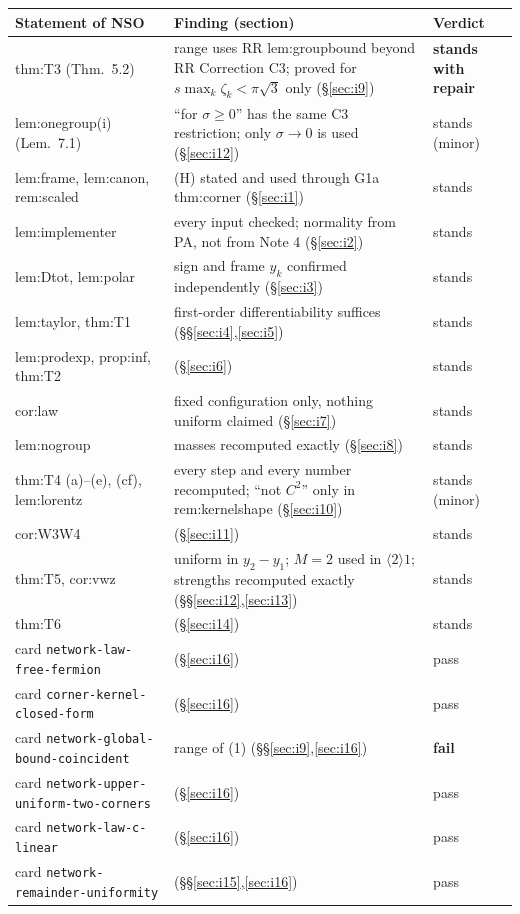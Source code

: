 \documentclass[11pt]{article}
\newcommand{\doc}{\textbf{NSO}}
\begin{document}
\begin{center}\small
\begin{tabularx}{\textwidth}{>{\raggedright\arraybackslash}p{} >{\raggedright\arraybackslash}X >{\raggedright\arraybackslash}p{}}\toprule
Statement of \doc & Finding (section) & Verdict\\\midrule
thm:T3 (Thm.~5.2) & range uses RR lem:groupbound beyond RR Correction C3; proved for $s\max_k\zeta_k<\pi\sqrt3$ only (\S\ref{sec:i9}) & \textbf{stands with repair}\\
lem:onegroup(i) (Lem.~7.1) & ``for $\sigma\ge0$'' has the same C3 restriction; only $\sigma\to0$ is used (\S\ref{sec:i12}) & stands (minor)\\
lem:frame, lem:canon, rem:scaled & (H) stated and used through G1a thm:corner (\S\ref{sec:i1}) & stands\\
lem:implementer & every input checked; normality from PA, not from Note 4 (\S\ref{sec:i2}) & stands\\
lem:Dtot, lem:polar & sign and frame $y_k$ confirmed independently (\S\ref{sec:i3}) & stands\\
lem:taylor, thm:T1 & first-order differentiability suffices (\S\S\ref{sec:i4},\ref{sec:i5}) & stands\\
lem:prodexp, prop:inf, thm:T2 & (\S\ref{sec:i6}) & stands\\
cor:law & fixed configuration only, nothing uniform claimed (\S\ref{sec:i7}) & stands\\
lem:nogroup & masses recomputed exactly (\S\ref{sec:i8}) & stands\\
thm:T4 (a)--(e), (cf), lem:lorentz & every step and every number recomputed; ``not $C^2$'' only in rem:kernelshape (\S\ref{sec:i10}) & stands (minor)\\
cor:W3W4 & (\S\ref{sec:i11}) & stands\\
thm:T5, cor:vwz & uniform in $y_2-y_1$; $M=2$ used in $\langle2\rangle1$; strengths recomputed exactly (\S\S\ref{sec:i12},\ref{sec:i13}) & stands\\
thm:T6 & (\S\ref{sec:i14}) & stands\\\midrule
card \texttt{network-law-free-fermion} & (\S\ref{sec:i16}) & pass\\
card \texttt{corner-kernel-closed-form} & (\S\ref{sec:i16}) & pass\\
card \texttt{network-global-bound-coincident} & range of (1) (\S\S\ref{sec:i9},\ref{sec:i16}) & \textbf{fail}\\
card \texttt{network-upper-uniform-two-corners} & (\S\ref{sec:i16}) & pass\\
card \texttt{network-law-c-linear} & (\S\ref{sec:i16}) & pass\\
card \texttt{network-remainder-uniformity} & (\S\S\ref{sec:i15},\ref{sec:i16}) & pass\\\bottomrule
\end{tabularx}
\end{center}
\end{document}
